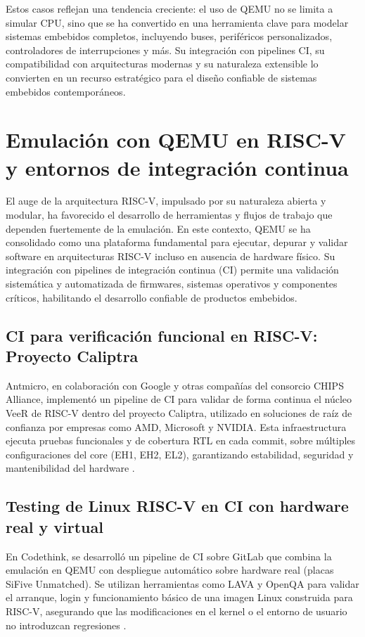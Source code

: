 \vspace{1em}
Estos casos reflejan una tendencia creciente: el uso de QEMU no se limita a simular CPU, sino que se ha convertido en una herramienta clave para modelar sistemas embebidos completos, incluyendo buses, periféricos personalizados, controladores de interrupciones y más. Su integración con pipelines CI, su compatibilidad con arquitecturas modernas y su naturaleza extensible lo convierten en un recurso estratégico para el diseño confiable de sistemas embebidos contemporáneos.
\section{Emulación con QEMU en RISC-V y entornos de integración continua}
\label{subsec:riscv-ci-industria}

El auge de la arquitectura RISC-V, impulsado por su naturaleza abierta y modular, ha favorecido el desarrollo de herramientas y flujos de trabajo que dependen fuertemente de la emulación. En este contexto, QEMU se ha consolidado como una plataforma fundamental para ejecutar, depurar y validar software en arquitecturas RISC-V incluso en ausencia de hardware físico. Su integración con pipelines de integración continua (CI) permite una validación sistemática y automatizada de firmwares, sistemas operativos y componentes críticos, habilitando el desarrollo confiable de productos embebidos.

\subsection*{CI para verificación funcional en RISC-V: Proyecto Caliptra}

Antmicro, en colaboración con Google y otras compañías del consorcio CHIPS Alliance, implementó un pipeline de CI para validar de forma continua el núcleo VeeR de RISC-V dentro del proyecto Caliptra, utilizado en soluciones de raíz de confianza por empresas como AMD, Microsoft y NVIDIA. Esta infraestructura ejecuta pruebas funcionales y de cobertura RTL en cada commit, sobre múltiples configuraciones del core (EH1, EH2, EL2), garantizando estabilidad, seguridad y mantenibilidad del hardware \cite{antmicro_caliptra}.

\subsection*{Testing de Linux RISC-V en CI con hardware real y virtual}

En Codethink, se desarrolló un pipeline de CI sobre GitLab que combina la emulación en QEMU con despliegue automático sobre hardware real (placas SiFive Unmatched). Se utilizan herramientas como LAVA y OpenQA para validar el arranque, login y funcionamiento básico de una imagen Linux construida para RISC-V, asegurando que las modificaciones en el kernel o el entorno de usuario no introduzcan regresiones \cite{codethink_ci}.

